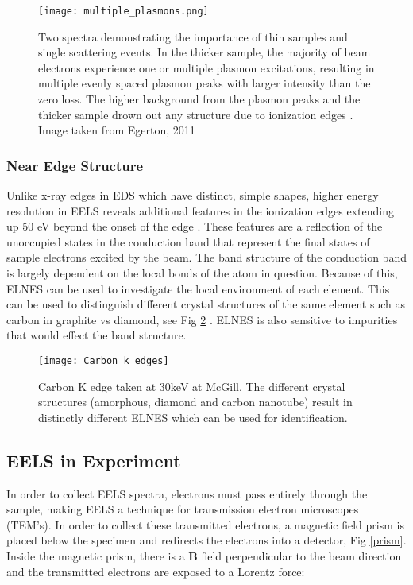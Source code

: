 \begin{figure}
	\centering
	\texttt{[image: multiple\_plasmons.png]}
	\caption{Two spectra demonstrating the importance of thin samples and single scattering events. In the thicker sample, the majority of beam electrons experience one or multiple plasmon excitations, resulting in multiple evenly spaced plasmon peaks with larger intensity than the zero loss.  The higher background from the plasmon peaks and the thicker sample drown out any structure due to ionization edges \cite{Egerton}. Image taken from Egerton, 2011 \cite{Egerton}}
	\label{multiple_plasmons}
\end{figure}



\subsubsection{Near Edge Structure}
Unlike x-ray edges in EDS which have distinct, simple shapes, higher energy resolution in EELS reveals additional features in the ionization edges extending up 50 eV beyond the onset of the edge \cite{Egerton}.   These features are a reflection of the unoccupied states in the conduction band that represent the final states of sample electrons excited by the beam.  The band structure of the conduction band is largely dependent on the local bonds of the atom in question.  Because of this, ELNES can be used to investigate the local environment of each element.  This can be used to distinguish different crystal structures of the same element such as carbon in graphite vs diamond, see Fig \ref{carbon-k-edge} \cite{hamon_elnes_2004}.  ELNES is also sensitive to impurities that would effect the band structure.  

\begin{figure}
	\centering
	\texttt{[image: Carbon\_k\_edges]}
	\caption{Carbon K edge taken at 30keV at McGill. The different crystal structures (amorphous, diamond and carbon nanotube) result in distinctly different ELNES which can be used for identification.   }
	\label{carbon-k-edge}
\end{figure}


\subsection{EELS in Experiment}

In order to collect EELS spectra, electrons must pass entirely through the sample, making EELS a technique for transmission electron microscopes (TEM's)\cite{Egerton}. In order to collect these transmitted electrons, a magnetic field prism is placed below the specimen and redirects the electrons into a detector, Fig \ref{prism}.  Inside the magnetic prism, there is a $\mathrm{\textbf{B}}$ field perpendicular to the beam direction and the transmitted electrons are exposed to a Lorentz force: 


